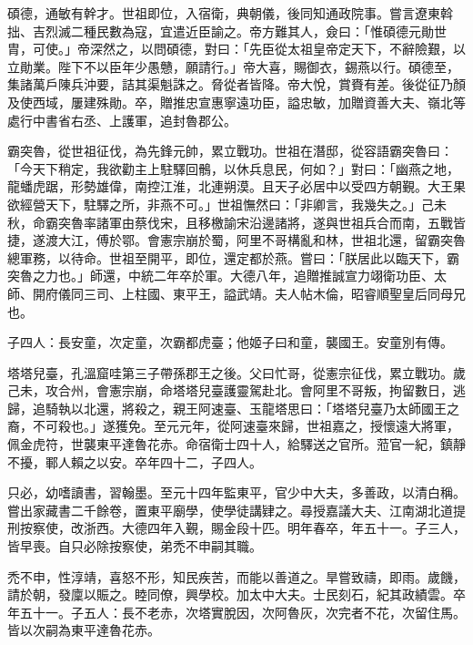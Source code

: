 \begin{pinyinscope}
 碩德，通敏有幹才。世祖即位，入宿衛，典朝儀，後同知通政院事。嘗言遼東斡拙、吉烈滅二種民數為寇，宜遣近臣諭之。帝方難其人，僉曰：「惟碩德元勛世胄，可使。」帝深然之，以問碩德，對曰：「先臣從太祖皇帝定天下，不辭險艱，以立勛業。陛下不以臣年少愚戇，願請行。」帝大喜，賜御衣，錫燕以行。碩德至，集諸萬戶陳兵沖要，詰其渠魁誅之。脅從者皆降。帝大悅，賞賚有差。後從征乃顏及使西域，屢建殊勛。卒，贈推忠宣惠寧遠功臣，謚忠敏，加贈資善大夫、嶺北等處行中書省右丞、上護軍，追封魯郡公。



 霸突魯，從世祖征伐，為先鋒元帥，累立戰功。世祖在潛邸，從容語霸突魯曰：「今天下稍定，我欲勸主上駐驛回鶻，以休兵息民，何如？」對曰：「幽燕之地，龍蟠虎踞，形勢雄偉，南控江淮，北連朔漠。且天子必居中以受四方朝覲。大王果欲經營天下，駐驛之所，非燕不可。」世祖憮然曰：「非卿言，我幾失之。」己未秋，命霸突魯率諸軍由蔡伐宋，且移檄諭宋沿邊諸將，遂與世祖兵合而南，五戰皆捷，遂渡大江，傅於鄂。會憲宗崩於蜀，阿里不哥構亂和林，世祖北還，留霸突魯總軍務，以待命。世祖至開平，即位，還定都於燕。嘗曰：「朕居此以臨天下，霸突魯之力也。」師還，中統二年卒於軍。大德八年，追贈推誠宣力翊衛功臣、太師、開府儀同三司、上柱國、東平王，謚武靖。夫人帖木倫，昭睿順聖皇后同母兄也。



 子四人：長安童，次定童，次霸都虎臺；他姬子曰和童，襲國王。安童別有傳。



 塔塔兒臺，孔溫窟哇第三子帶孫郡王之後。父曰忙哥，從憲宗征伐，累立戰功。歲己未，攻合州，會憲宗崩，命塔塔兒臺護靈駕赴北。會阿里不哥叛，拘留數日，逃歸，追騎執以北還，將殺之，親王阿速臺、玉龍塔思曰：「塔塔兒臺乃太師國王之裔，不可殺也。」遂獲免。至元元年，從阿速臺來歸，世祖嘉之，授懷遠大將軍，佩金虎符，世襲東平達魯花赤。命宿衛士四十人，給驛送之官所。蒞官一紀，鎮靜不擾，鄆人賴之以安。卒年四十二，子四人。



 只必，幼嗜讀書，習翰墨。至元十四年監東平，官少中大夫，多善政，以清白稱。嘗出家藏書二千餘卷，置東平廟學，使學徒講肄之。尋授嘉議大夫、江南湖北道提刑按察使，改浙西。大德四年入覲，賜金段十匹。明年春卒，年五十一。子三人，皆早喪。自只必除按察使，弟禿不申嗣其職。



 禿不申，性淳靖，喜怒不形，知民疾苦，而能以善道之。旱嘗致禱，即雨。歲饑，請於朝，發廩以賑之。睦同僚，興學校。加太中大夫。士民刻石，紀其政績雲。卒年五十一。子五人：長不老赤，次塔實脫因，次阿魯灰，次完者不花，次留住馬。皆以次嗣為東平達魯花赤。




\end{pinyinscope}
